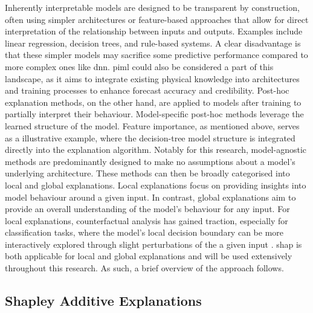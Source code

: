 Inherently interpretable models are designed to be transparent by construction, often using simpler architectures or feature-based approaches that allow for direct interpretation of the relationship between inputs and outputs. Examples include linear regression, decision trees, and rule-based systems. A clear disadvantage is that these simpler models may sacrifice some predictive performance compared to more complex ones like \acrfull{dnn}. \acrshort{piml} could also be considered a part of this landscape, as it aims to integrate existing physical knowledge into architectures and training processes to enhance forecast accuracy and credibility. Post-hoc explanation methods, on the other hand, are applied to models after training to partially interpret their behaviour. Model-specific post-hoc methods leverage the learned structure of the model. Feature importance, as mentioned above, serves as a illustrative example, where the decision-tree model structure is integrated directly into the explanation algorithm. Notably for this research, model-agnostic methods are predominantly designed to make no assumptions about a model's underlying architecture. These methods can then be broadly categorised into local and global explanations. Local explanations focus on providing insights into model behaviour around a given input. In contrast, global explanations aim to provide an overall understanding of the model's behaviour for any input. For local explanations, counterfactual analysis has gained traction, especially for classification tasks, where the model's local decision boundary can be more interactively explored through slight perturbations of the a given input \citep{Mothilal2019}. \acrfull{shap} is both applicable for local and global explanations and will be used extensively throughout this research. As such, a brief overview of the approach follows.

\subsection{Shapley Additive Explanations}

